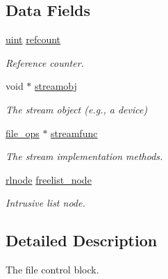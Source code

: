 \subsection*{Data Fields}
\begin{DoxyCompactItemize}
\item 
\mbox{\label{structfile__control__block_a629271d79f15500a74096ec65a4adedb}} 
\hyperlink{bios_8h_a91ad9478d81a7aaf2593e8d9c3d06a14}{uint} \hyperlink{structfile__control__block_a629271d79f15500a74096ec65a4adedb}{refcount}
\begin{DoxyCompactList}\small\item\em Reference counter. \end{DoxyCompactList}\item 
\mbox{\label{structfile__control__block_a1460eb54b4a65e747b9b9ec3f6a798d6}} 
void $\ast$ \hyperlink{structfile__control__block_a1460eb54b4a65e747b9b9ec3f6a798d6}{streamobj}
\begin{DoxyCompactList}\small\item\em The stream object (e.\+g., a device) \end{DoxyCompactList}\item 
\mbox{\label{structfile__control__block_aa49f26d3baceeb074fa00f9e5caf978b}} 
\hyperlink{group__dev_gaab625d8ae3a95e942ed10ed1579f5042}{file\+\_\+ops} $\ast$ \hyperlink{structfile__control__block_aa49f26d3baceeb074fa00f9e5caf978b}{streamfunc}
\begin{DoxyCompactList}\small\item\em The stream implementation methods. \end{DoxyCompactList}\item 
\mbox{\label{structfile__control__block_ac84640123f400fa3fe3cb64df08e6bd6}} 
\hyperlink{group__rlists_ga8f6244877f7ce2322c90525217ea6e7a}{rlnode} \hyperlink{structfile__control__block_ac84640123f400fa3fe3cb64df08e6bd6}{freelist\+\_\+node}
\begin{DoxyCompactList}\small\item\em Intrusive list node. \end{DoxyCompactList}\end{DoxyCompactItemize}


\subsection{Detailed Description}
The file control block. 

